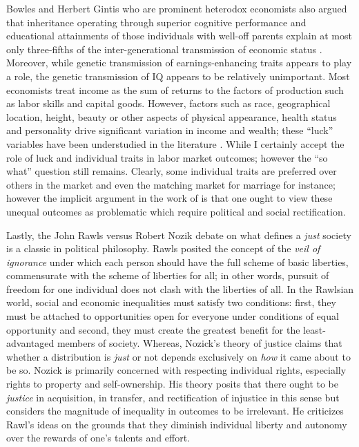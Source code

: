 \documentclass[12pt]{article}
\newcommand{\1}{\mathbbm 1}
\begin{document}
	
	Bowles and Herbert Gintis who are prominent heterodox economists also argued that inheritance operating through superior cognitive performance and educational attainments of those individuals  with  well-off  parents  explain  at  most only  three-fifths  of  the inter-generational transmission of economic status \cite{bowles2002inheritance}. Moreover, while genetic transmission of earnings-enhancing traits appears to play a role, the genetic transmission of IQ appears to be relatively unimportant. Most economists treat income as the sum of returns to the factors of production such as labor skills and capital goods. However, factors such as race, geographical location, height, beauty or other aspects of physical appearance, health status  and  personality drive significant variation in income and wealth; these ``luck'' variables have been understudied in the literature \cite{bowles2002inheritance}. While I certainly accept the role of luck and individual traits in labor market outcomes; however the ``so what'' question still remains. Clearly, some individual traits are preferred over others in the market and even the matching market for marriage for instance; however the implicit argument in the work of \cite{bowles2002inheritance} is that one ought to view these unequal outcomes as problematic which require political and social rectification.
	
	
	
	Lastly, the John Rawls \cite{rawlstheory1971} versus Robert Nozik \cite{nozick1974anarchy} debate on what defines a \textit{just} society is a classic in political philosophy. Rawls posited the concept of the \textit{veil of ignorance} under which each person should have the full scheme of basic liberties, commensurate with the scheme of liberties for all; in other words, pursuit of freedom for one individual does not clash with the liberties of all. In the Rawlsian world, social and economic inequalities must satisfy two conditions: first, they must be attached to opportunities open for everyone under conditions of equal opportunity and second, they must create the greatest benefit for the least-advantaged members of society. Whereas, Nozick's \cite{nozick1974anarchy}  theory of  justice  claims that  whether  a  distribution  is  \textit{just}  or  not  depends exclusively  on  \textit{how}  it came  about to be so. Nozick is primarily concerned with respecting individual rights, especially rights to property  and  self-ownership. His theory posits that there ought to be \textit{justice} in acquisition, in transfer, and  rectification  of injustice in this sense but considers the magnitude of inequality in outcomes to be irrelevant. He criticizes Rawl's ideas on the grounds that they diminish individual liberty and autonomy over the rewards of one's talents and effort.
	
\end{document}
